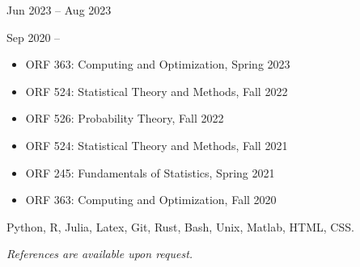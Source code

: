 \documentclass[
  date,
  number,
]{wgu-cv}
\begin{document}

{}
{Jun 2023 -- Aug 2023}

\vspace*{5mm}

{}
{Sep 2020 --}

\begin{itemize}

  \item
    ORF 363:
    Computing and Optimization,
    Spring 2023

  \item
    ORF 524:
    Statistical Theory and Methods,
    Fall 2022

  \item
    ORF 526:
    Probability Theory,
    Fall 2022

  \item
    ORF 524:
    Statistical Theory and Methods,
    Fall 2021

  \item
    ORF 245:
    Fundamentals of Statistics,
    Spring 2021

  \item
    ORF 363:
    Computing and Optimization,
    Fall 2020

\end{itemize}


Python,
R,
Julia,
Latex,
Git,
Rust,
Bash,
Unix,
Matlab,
HTML,
CSS.


\emph{References are available upon request.}

\end{document}

